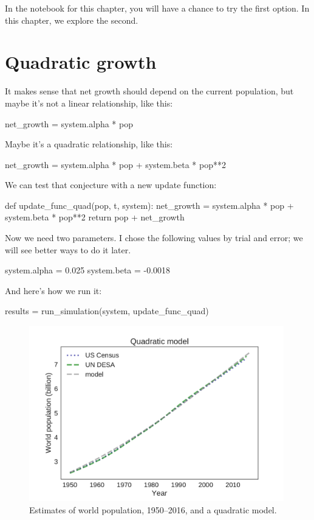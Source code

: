 \documentclass[12pt]{book}
\theoremstyle{exercise}
\begin{document}
In the notebook for this chapter, you will have a chance to try the first option.  In this chapter, we explore the second.


\section{Quadratic growth}
\label{quadratic}

It makes sense that net growth should depend on the current population, but maybe it's not a linear relationship, like this:

\begin{python}
    net_growth = system.alpha * pop
\end{python}

Maybe it's a quadratic relationship, like this:


\begin{python}
    net_growth = system.alpha * pop + system.beta * pop**2
\end{python}

We can test that conjecture with a new update function:

\begin{python}
def update_func_quad(pop, t, system):
    net_growth = system.alpha * pop + system.beta * pop**2
    return pop + net_growth
\end{python}

Now we need two parameters.  I chose the following values by trial and error; we will see better ways to do it later.


\begin{python}
system.alpha = 0.025
system.beta = -0.0018
\end{python}

And here's how we run it:

\begin{python}
results = run_simulation(system, update_func_quad)
\end{python}

\begin{figure}
\centerline{\includegraphics[height=3in]{figs/chap03-fig04.pdf}}
\caption{Estimates of world population, 1950--2016, and a quadratic model.}
\label{chap03-fig04}
\end{figure}
\end{document}
